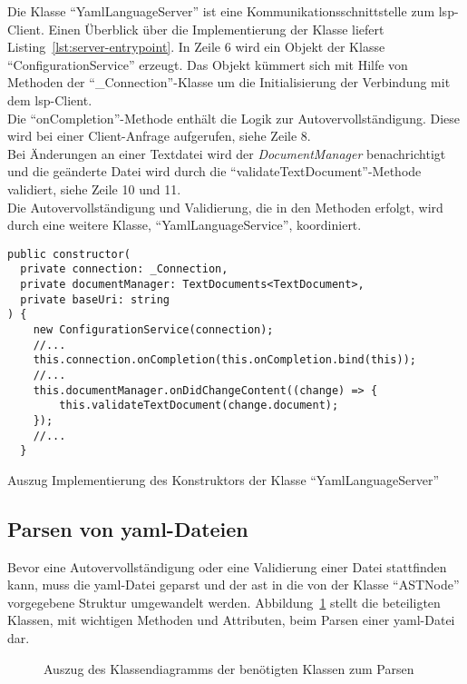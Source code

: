 Die Klasse ``YamlLanguageServer'' ist eine Kommunikationsschnittstelle zum \ac{lsp}-Client.
Einen Überblick über die Implementierung der Klasse liefert Listing~\ref{lst:server-entrypoint}.
In Zeile 6 wird ein Objekt der Klasse ``ConfigurationService'' erzeugt. Das Objekt kümmert sich
mit Hilfe von Methoden der ``\_Connection''-Klasse um die Initialisierung der Verbindung mit dem \ac{lsp}-Client.
\\
Die ``onCompletion''-Methode enthält die Logik zur Autovervollständigung. Diese wird bei einer Client-Anfrage
aufgerufen, siehe Zeile 8.
\\
Bei Änderungen an einer Textdatei wird der \textit{DocumentManager} benachrichtigt und die geänderte Datei
wird durch die ``validateTextDocument''-Methode validiert, siehe Zeile 10 und 11.
\\
Die Autovervollständigung und Validierung, die in den Methoden erfolgt, wird durch eine weitere Klasse, ``YamlLanguageService'', koordiniert.

\begin{listing}[htp]
      \begin{verbatim}
public constructor(
  private connection: _Connection,
  private documentManager: TextDocuments<TextDocument>,
  private baseUri: string
) {
    new ConfigurationService(connection);
    //...
    this.connection.onCompletion(this.onCompletion.bind(this));
    //...
    this.documentManager.onDidChangeContent((change) => {
        this.validateTextDocument(change.document);
    });
    //...
  }
      \end{verbatim}
      \caption{Auszug Implementierung des Konstruktors der Klasse ``YamlLanguageServer''}
      \label{lst:server-entrypoint}
\end{listing}

\subsection{Parsen von \acs{yaml}-Dateien}

Bevor eine Autovervollständigung oder eine Validierung einer Datei stattfinden kann, muss die \ac{yaml}-Datei geparst und
der \ac{ast} in die von der Klasse ``ASTNode'' vorgegebene Struktur umgewandelt werden.
Abbildung~\ref{fig:class-diagram-yaml-language-service-parser} stellt die beteiligten Klassen, mit wichtigen Methoden und Attributen,
beim Parsen einer \ac{yaml}-Datei dar.

\begin{figure}[htp] %
      \centering
      \caption{Auszug des Klassendiagramms der benötigten Klassen zum Parsen}
      \label{fig:class-diagram-yaml-language-service-parser}
\end{figure}


